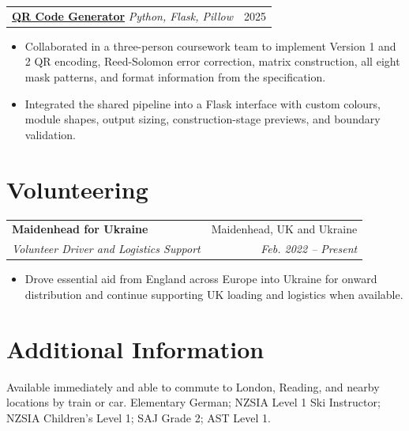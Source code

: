 \documentclass[a4paper,10pt]{article}
\makeatletter
\newcommand{\entry}[4]{%
  \begin{tabular*}{\textwidth}{@{}l@{\extracolsep{\fill}}r@{}}
    \textbf{#1} & #2 \\
    \textit{#3} & \textit{#4}
  \end{tabular*}\vspace{-1pt}
}
\newcommand{\project}[2]{%
  \begin{tabular*}{\textwidth}{@{}l@{\extracolsep{\fill}}r@{}}
    #1 & #2
  \end{tabular*}\vspace{-1pt}
}
\newenvironment{cvitems}
  {\begin{itemize}[leftmargin=1.25em,itemsep=1.5pt,topsep=2pt,parsep=0pt,partopsep=0pt]}
  {\end{itemize}\vspace{2pt}}
\makeatother
\begin{document}
\project{\textbf{\href{https://gabrieldorosh.com/projects/qr-code-generator/}{QR Code Generator}}
  \textbar{} \emph{Python, Flask, Pillow}}{2025}
\begin{cvitems}
  \item Collaborated in a three-person coursework team to implement Version 1 and 2
    QR encoding, Reed-Solomon error correction, matrix construction, all eight mask
    patterns, and format information from the specification.
  \item Integrated the shared pipeline into a Flask interface with custom colours,
    module shapes, output sizing, construction-stage previews, and boundary
    validation.
\end{cvitems}

\section{Volunteering}
\entry{Maidenhead for Ukraine}{Maidenhead, UK and Ukraine}
  {Volunteer Driver and Logistics Support}{Feb. 2022 -- Present}
\begin{cvitems}
  \item Drove essential aid from England across Europe into Ukraine for onward
    distribution and continue supporting UK loading and logistics when available.
\end{cvitems}

\section{Additional Information}
Available immediately and able to commute to London, Reading, and nearby locations
by train or car. Elementary German; NZSIA Level 1 Ski Instructor; NZSIA Children's
Level 1; SAJ Grade 2; AST Level 1.
\end{document}
